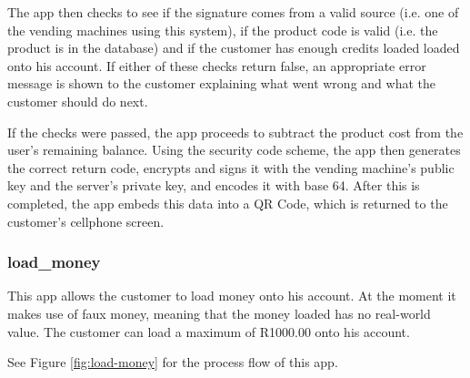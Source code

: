 The app then checks to see if the signature comes from a valid source (i.e. one of the vending
machines using this system), if the product code is valid (i.e. the product is in the database)
and if the customer has enough credits loaded loaded onto his account. If either of these
checks return false, an appropriate error message is shown to the customer explaining what
went wrong and what the customer should do next.

If the checks were passed, the app proceeds to subtract the product cost from the user's
remaining balance. Using the security code scheme, the app then generates the correct return
code, encrypts and signs it with the vending machine's public key and the server's private key,
and encodes it with base 64. After this is completed, the app embeds this data into a QR Code,
which is returned to the customer's cellphone screen. 

\subsubsection{load\_money}

This app allows the customer to load money onto his account. At the moment it makes use of
faux money, meaning that the money loaded has no real-world value. The customer can load a
maximum of R1000.00 onto his account.

See Figure \ref{fig:load-money} for the process flow of this
app.

